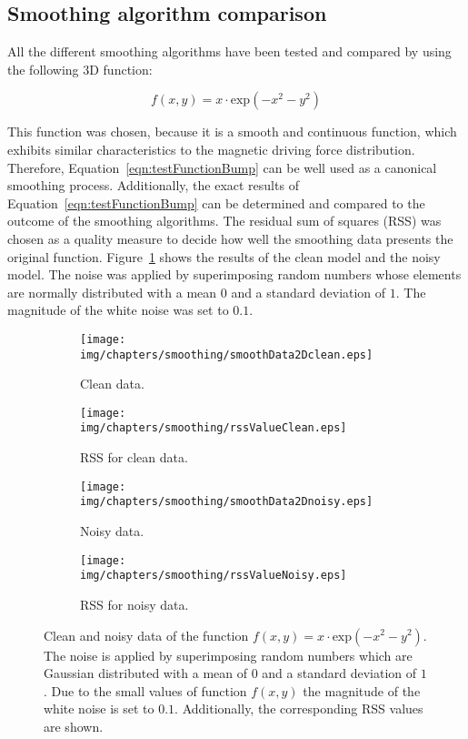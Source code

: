 \subsection{Smoothing algorithm comparison}\label{subsec:smootingAlgorithmComparison}
All the different smoothing algorithms have been tested and compared by using the following 3D function:

\begin{equation}
	f(x,y) = x\cdot \text{exp}\left(-x^{2}-y^{2}\right)
	\label{eqn:testFunctionBump}
\end{equation}

This function was chosen, because it is a smooth and continuous function, which exhibits similar characteristics to the magnetic driving force distribution. Therefore, Equation~\ref{eqn:testFunctionBump} can be well used as a canonical smoothing process. Additionally, the exact results of Equation~\ref{eqn:testFunctionBump} can be determined and compared to the outcome of the smoothing algorithms. The residual sum of squares (RSS) was chosen as a quality measure to decide how well the smoothing data presents the original function. Figure~\ref{fig:smoothingAlgorithmComparisonOrigin} shows the results of the clean model and the noisy model. The noise was applied by superimposing random numbers whose elements are normally distributed with a mean $0$ and a standard deviation of $1$. The magnitude of the white noise was set to $0.1$.

\begin{figure}[htb]
\centering
	\begin{subfigure}[b]{0.47\textwidth}
		\texttt{[image: img/chapters/smoothing/smoothData2Dclean.eps]}
		\caption{Clean data.}
    \end{subfigure}
	\begin{subfigure}[b]{0.47\textwidth}
		\texttt{[image: img/chapters/smoothing/rssValueClean.eps]}
		\caption{RSS for clean data.}
	\end{subfigure}
	\begin{subfigure}[b]{0.47\textwidth}
		\texttt{[image: img/chapters/smoothing/smoothData2Dnoisy.eps]}
		\caption{Noisy data.}
	\end{subfigure}
	\begin{subfigure}[b]{0.47\textwidth}
		\texttt{[image: img/chapters/smoothing/rssValueNoisy.eps]}
		\caption{RSS for noisy data.}
	\end{subfigure}
\caption[Clean and noisy data of the function $f(x,y) = x\cdot \text{exp}\left(-x^{2}-y^{2}\right)$]{Clean and noisy data of the function $f(x,y) = x\cdot \text{exp}\left(-x^{2}-y^{2}\right)$. The noise is applied by superimposing random numbers which are Gaussian distributed with a mean of $0$ and a standard deviation of $1$. Due to the small values of function $f(x,y)$ the magnitude of the white noise is set to $0.1$. Additionally, the corresponding RSS values are shown.}%
\label{fig:smoothingAlgorithmComparisonOrigin}
\end{figure}

